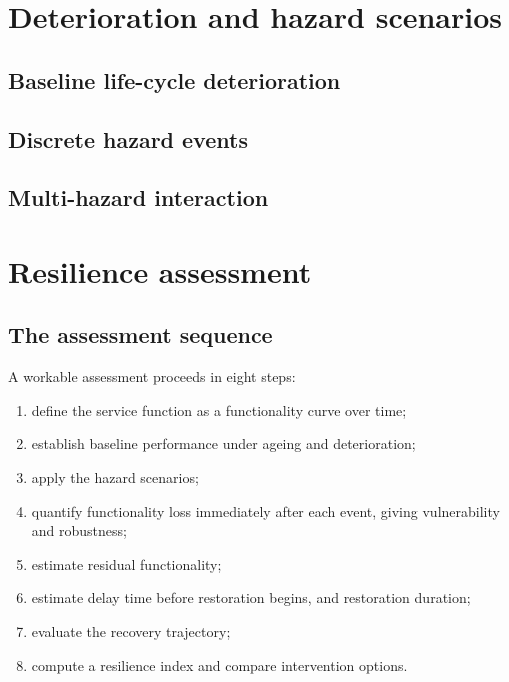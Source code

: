 \section{Deterioration and hazard scenarios}
\label{sec:deterioration-and-hazards}

\subsection{Baseline life-cycle deterioration}
\label{sec:baseline-deterioration}

\subsection{Discrete hazard events}
\label{sec:discrete-hazards}

\subsection{Multi-hazard interaction}
\label{sec:multi-hazard}

\section{Resilience assessment}
\label{sec:resilience-assessment}

\subsection{The assessment sequence}
\label{sec:resilience-sequence}
A workable assessment proceeds in eight steps:

\begin{enumerate}[nosep]
  \item define the service function as a functionality curve over time;
  \item establish baseline performance under ageing and deterioration;
  \item apply the hazard scenarios;
  \item quantify functionality loss immediately after each event, giving
        vulnerability and robustness;
  \item estimate residual functionality;
  \item estimate delay time before restoration begins, and restoration
        duration;
  \item evaluate the recovery trajectory;
  \item compute a resilience index and compare intervention options.
\end{enumerate}

